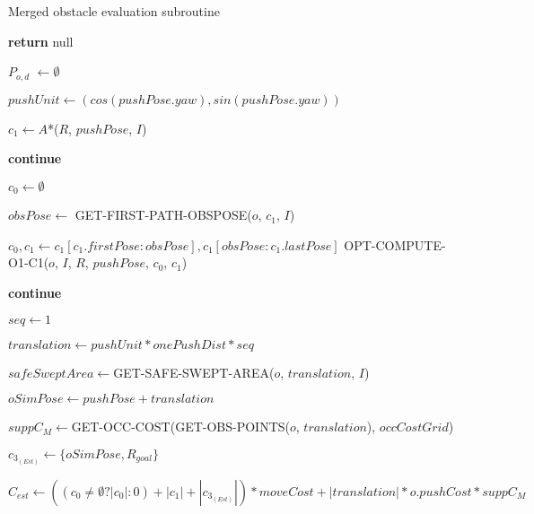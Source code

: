 \begin{algorithm}[H]

  \caption{Merged obstacle evaluation subroutine}

  \label{alg:07-custom-merge-optimized-planforobstacle-part1}

  \begin{algorithmic}[1]


        \State \textbf{return} null
      \EndIf

      \State $P_{o,d}$ $\gets \emptyset$

        \State $pushUnit \gets (cos(pushPose.yaw), sin(pushPose.yaw))$

        \State $c_{1} \gets A$*($R$, $pushPose$, $I$)

          \State \textbf{continue}
        \EndIf

        \State $c_{0} \gets \emptyset$


          \State $obsPose \gets$ GET-FIRST-PATH-OBSPOSE($o$, $c_{1}$, $I$)

            \State $c_{0}, c_{1} \gets c_{1}[c_{1}.firstPose:obsPose], c_{1}[obsPose:c_{1}.lastPose]$
          \Else
            \State OPT-COMPUTE-O1-C1($o$, $I$, $R$, $pushPose$, $c_{0}$, $c_{1}$)

              \State \textbf{continue}
            \EndIf
          \EndIf
        \EndIf

        \State $seq \gets 1$

        \State $translation \gets pushUnit * onePushDist * seq$

        \State $safeSweptArea \gets $GET-SAFE-SWEPT-AREA($o$, $translation$, $I$)

        \State $oSimPose \gets pushPose + translation$

        \State $suppC_{M} \gets $GET-OCC-COST(GET-OBS-POINTS($o$, $translation$), $occCostGrid$)

        \State $c_{3_{(Est)}} \gets \{oSimPose, R_{goal}\}$

        \State $C_{est} \gets ((c_{0} \neq \emptyset ? |c_{0}| : 0) + |c_{1}| + |c_{3_{(Est)}}|) * moveCost + |translation| * o.pushCost * suppC_{M}$


  \end{algorithmic}
\end{algorithm}


